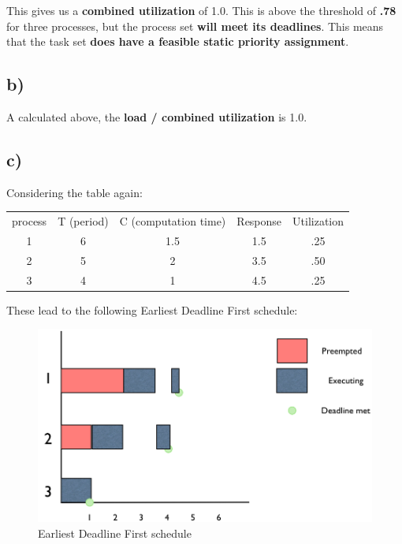 \documentclass[11pt,letterpaper]{article}
\begin{document}
This gives us a \textbf{combined utilization} of 1.0. This is above the threshold of \textbf{.78} for three
processes, but the process set \textbf{will meet its deadlines}. This means that the task set 
\textbf{does have a feasible static priority assignment}.

\subsection*{b)}
A calculated above, the \textbf{load / combined utilization} is 1.0.

\pagebreak

\subsection*{c)}
Considering the table again:

\begin{tabular}{ c c c c  c }
	process	&	T (period)		& C (computation time) 	& Response	& Utilization \\
	1		&	6			& 1.5 				& 1.5 		& .25 \\
	2		&	5			& 2 					& 3.5 		& .50 \\
	3		&	4			& 1 					& 4.5 		& .25 \\
\end{tabular}

These lead to the following Earliest Deadline First schedule:

\begin{figure}[!h]
        \begin{center}
		\includegraphics[width=120mm]{images/deadline_first}
                \caption{Earliest Deadline First schedule}
                \label{deadline_first}
        \end{center}
\end{figure}
\end{document}
